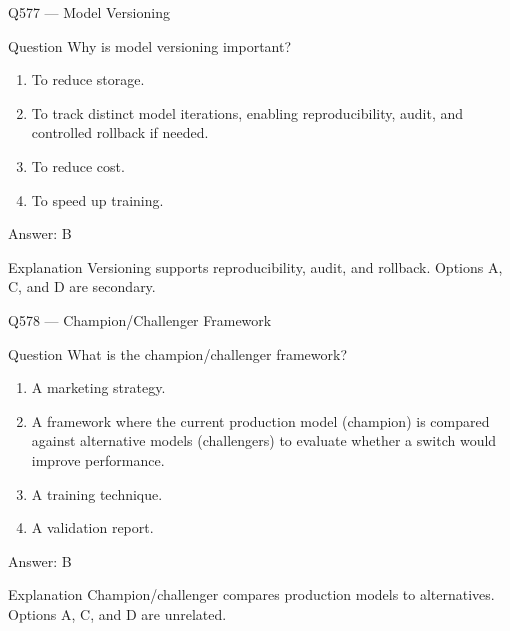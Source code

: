 \documentclass[aspectratio=169,8pt]{beamer}
\begin{document}
	\begin{frame}{Q577 --- Model Versioning}
		\begin{block}{Question}
			Why is model versioning important?
			\begin{enumerate}
				\item To reduce storage.
				\item To track distinct model iterations, enabling reproducibility, audit, and controlled rollback if needed.
				\item To reduce cost.
				\item To speed up training.
			\end{enumerate}
		\end{block}
		\begin{exampleblock}{Answer: B}\end{exampleblock}
		\begin{block}{Explanation}
			Versioning supports reproducibility, audit, and rollback. Options A, C, and D are secondary.
		\end{block}
	\end{frame}
	
	\begin{frame}{Q578 --- Champion/Challenger Framework}
		\begin{block}{Question}
			What is the champion/challenger framework?
			\begin{enumerate}
				\item A marketing strategy.
				\item A framework where the current production model (champion) is compared against alternative models (challengers) to evaluate whether a switch would improve performance.
				\item A training technique.
				\item A validation report.
			\end{enumerate}
		\end{block}
		\begin{exampleblock}{Answer: B}\end{exampleblock}
		\begin{block}{Explanation}
			Champion/challenger compares production models to alternatives. Options A, C, and D are unrelated.
		\end{block}
	\end{frame}
	
\end{document}
